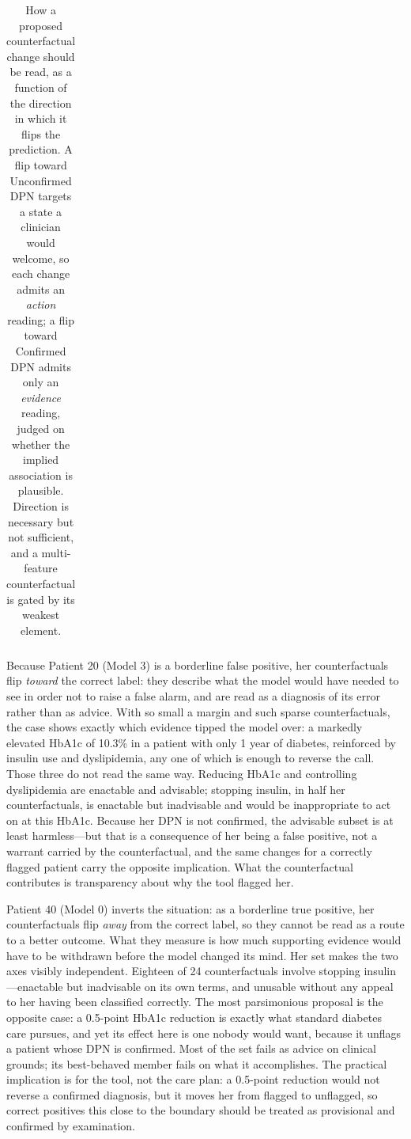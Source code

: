\documentclass[pdflatex,sn-mathphys-num]{sn-jnl}%
\theoremstyle{thmstyleone}%
\theoremstyle{thmstyletwo}%
\theoremstyle{thmstylethree}%
\begin{document}
\begin{table}[tbp]
\begin{tabular}{p{0.17\linewidth} p{0.36\linewidth} p{0.36\linewidth}}
        \bottomrule
    \end{tabular}
    \caption{How a proposed counterfactual change should be read, as a function of the direction in which it
flips the prediction. A flip toward Unconfirmed DPN targets a state a clinician would welcome, so each
change admits an \textit{action} reading; a flip toward Confirmed DPN admits only an \textit{evidence}
reading, judged on whether the implied association is plausible. Direction is necessary but not
sufficient, and a multi-feature counterfactual is gated by its weakest element.}
\label{tab:cf-direction-reading}
\end{table}

Because Patient 20 (Model 3) is a borderline false positive, her counterfactuals flip \emph{toward} the correct label:
they describe what the model would have needed to see in order not to raise a false alarm, and are
read as a diagnosis of its error rather than as advice. With so small a margin and such sparse
counterfactuals, the case shows exactly which evidence tipped the model over: a markedly elevated
HbA1c of 10.3\% in a patient with only 1 year of diabetes, reinforced by insulin use and dyslipidemia,
any one of which is enough to reverse the call. Those three do not read the same way. Reducing HbA1c
and controlling dyslipidemia are enactable and advisable; stopping insulin, in half her
counterfactuals, is enactable but inadvisable and would be inappropriate to act on at this HbA1c.
Because her DPN is not confirmed, the advisable subset is at least harmless---but that is a
consequence of her being a false positive, not a warrant carried by the counterfactual, and the same
changes for a correctly flagged patient carry the opposite implication. What the counterfactual
contributes is transparency about why the tool flagged her.

Patient 40 (Model 0) inverts the situation: as a borderline true positive, her counterfactuals flip \emph{away} from the
correct label, so they cannot be read as a route to a better outcome. What they measure is how much
supporting evidence would have to be withdrawn before the model changed its mind. Her set makes the
two axes visibly independent. Eighteen of 24 counterfactuals involve stopping insulin---enactable but
inadvisable on its own terms, and unusable without any appeal to her having been classified
correctly. The most parsimonious proposal is the opposite case: a 0.5-point HbA1c reduction is exactly
what standard diabetes care pursues, and yet its effect here is one nobody would want, because it
unflags a patient whose DPN is confirmed. Most of the set fails as advice on clinical grounds; its
best-behaved member fails on what it accomplishes. The practical implication is for the tool, not the
care plan: a 0.5-point reduction would not reverse a confirmed diagnosis, but it moves her from
flagged to unflagged, so correct positives this close to the boundary should be treated as provisional
and confirmed by examination.
\end{document}
